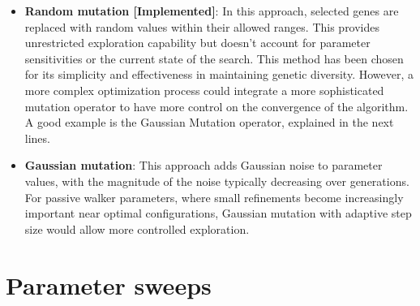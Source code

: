 \begin{itemize}
    \item \textbf{Random mutation [Implemented]}:
    In this approach, selected genes are replaced with random values within their allowed ranges.
    This provides unrestricted exploration capability but doesn't account for parameter sensitivities or the current state of the search.
    This method has been chosen for its simplicity and effectiveness in maintaining genetic diversity.
    However, a more complex optimization process could integrate a more sophisticated mutation operator to have more control on the convergence of the algorithm.
    A good example is the Gaussian Mutation operator, explained in the next lines.

    \item \textbf{Gaussian mutation}:
    This approach adds Gaussian noise to parameter values, with the magnitude of the noise typically decreasing over generations.
    For passive walker parameters, where small refinements become increasingly important near optimal configurations, Gaussian mutation with adaptive step size would allow more controlled exploration. 
\end{itemize}

\section{Parameter sweeps}

